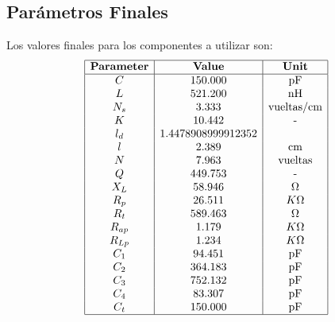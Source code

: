\subsection{Parámetros Finales}
Los valores finales para los componentes a utilizar son:
\[
\begin{array}{|c|c|c|}
\hline
\textbf{Parameter} & \textbf{Value} & \textbf{Unit} \\
\hline
C & 150.000 & \text{pF} \\
L & 521.200 & \text{nH} \\
N_s & 3.333 & \text{vueltas/cm} \\
K & 10.442 & \text{-} \\
l_d & 1.4478908999912352 & \text{} \\
l & 2.389 & \text{cm} \\
N & 7.963 & \text{vueltas} \\
Q & 449.753 & \text{-} \\
X_L & 58.946 & \Omega \\
R_p & 26.511 & K\Omega \\
R_t & 589.463 & \Omega \\
R_{ap} & 1.179 & K\Omega \\
R_{Lp} & 1.234 & K\Omega \\
C_1 & 94.451 & \text{pF} \\
C_2 & 364.183 & \text{pF} \\
C_3 & 752.132 & \text{pF} \\
C_4 & 83.307 & \text{pF} \\
C_t & 150.000 & \text{pF} \\
\hline
\end{array}
\]